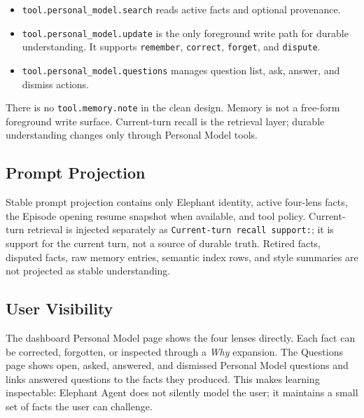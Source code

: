 \begin{itemize}
  \item \texttt{tool.personal\_model.search} reads active facts and optional
  provenance.
  \item \texttt{tool.personal\_model.update} is the only foreground write path
  for durable understanding. It supports \texttt{remember}, \texttt{correct},
  \texttt{forget}, and \texttt{dispute}.
  \item \texttt{tool.personal\_model.questions} manages question list, ask,
  answer, and dismiss actions.
\end{itemize}

There is no \texttt{tool.memory.note} in the clean design. Memory is not a
free-form foreground write surface. Current-turn recall is the retrieval layer;
durable understanding changes only through Personal Model tools.

\subsection{Prompt Projection}

Stable prompt projection contains only Elephant identity, active four-lens facts,
the Episode opening resume snapshot when available, and tool policy.
Current-turn retrieval is injected separately as \texttt{Current-turn recall support:}; it is
support for the current turn, not a source of durable truth. Retired facts,
disputed facts, raw memory entries, semantic index rows, and style summaries
are not projected as stable understanding.

\subsection{User Visibility}

The dashboard Personal Model page shows the four lenses directly. Each fact can be
corrected, forgotten, or inspected through a \textit{Why} expansion. The
Questions page shows open, asked, answered, and dismissed Personal Model
questions and links answered questions to the facts they produced. This makes
learning inspectable: Elephant Agent does not silently model the user; it maintains a
small set of facts the user can challenge.
